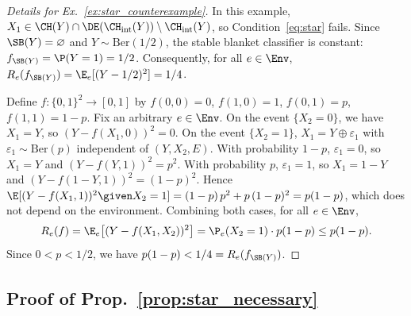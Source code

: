 \begin{proof}[Details for Ex.~\ref{ex:star_counterexample}]
In this example, $X_1 \in \CH(Y) \cap \DE(\CH_\mathrm{int}(Y)) \setminus \CH_\mathrm{int}(Y)$, so Condition~\eqref{eq:star} fails. Since $\SB(Y) = \varnothing$ and $Y \sim \mathrm{Ber}(1/2)$, the stable blanket classifier is constant: $f_{\SB(Y)}= \P(Y=1) = 1/2$. Consequently, for all $e \in \Env$, $R_e(f_{\SB(Y)}) = \E_e[(Y - 1/2)^2] = 1/4$.



Define $f\colon \{0,1\}^2 \to [0,1]$ by $f(0,0) = 0$, $f(1,0) = 1$, $f(0,1) = p$, $f(1,1) = 1-p$. Fix an arbitrary $e \in \Env$. On the event $\{X_2 = 0\}$, we have $X_1 = Y$, so $(Y - f(X_1, 0))^2 = 0$. On the event $\{X_2 = 1\}$, $X_1 = Y \oplus \varepsilon_1 $ with $\varepsilon_1  \sim \mathrm{Ber}(p)$ independent of $(Y, X_2, E)$.
With probability $1-p$, $\varepsilon_1  = 0$, so $X_1 = Y$ and $(Y - f(Y, 1))^2 = p^2$. With probability $p$, $\varepsilon_1  = 1$, so $X_1 = 1-Y$ and $(Y - f(1-Y, 1))^2 = (1-p)^2$. Hence $\E[(Y - f(X_1, 1))^2 \given X_2 = 1] = (1-p)\, p^2 + p\,(1-p)^2 = p(1-p)$, which does not depend on the environment. Combining both cases, for all $e \in \Env$,
$$
  R_e(f) = \E_e \big[(Y - f(X_1, X_2))^2\big] = \P_e(X_2 = 1) \cdot p(1-p) \leq p(1-p).
$$
Since $0 < p < 1/2$, we have $p(1-p) < 1/4 = R_e(f_{\SB(Y)})$.
\end{proof}


\subsection{Proof of Prop.~\ref{prop:star_necessary}}
\label{app:proof_prop:star_necessary}


